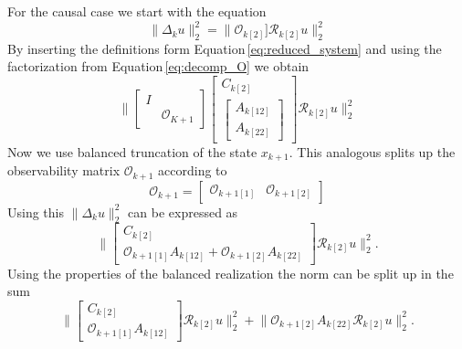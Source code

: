 \documentclass[doctype=mastersthesis,BCOR=15mm,biblatex]{ldvbook}%
\newcommand{\R}{\mathcal{R}} %
\newcommand{\Ob}{\mathcal{O}} %
\newcommand{\eye}{I} %
\begin{document}
For the causal case we start with the equation
\begin{equation}
	\|\Delta_k u\|_2^2 = \|\Ob_{k[2]}] \R_{k[2]} u\|_2^2
\end{equation}
By inserting the definitions form Equation\,\ref{eq:reduced_system} and using the factorization from Equation\,\ref{eq:decomp_O} we obtain 
\begin{equation}
	\Bigg\|
	\begin{bmatrix}
	\eye & \\
	& \Ob_{K+1}
	\end{bmatrix}
	\begin{bmatrix}
	C_{k[2]}\\
	\begin{bmatrix}
	A_{k[12]}\\
	A_{k[22]}
	\end{bmatrix}
	\end{bmatrix}  \R_{k[2]} u\Bigg\|_2^2
\end{equation}
Now we use balanced truncation of the state $x_{k+1}$.
This analogous splits up the observability matrix $\Ob_{k+1}$ according to
\begin{equation}
	\Ob_{k+1} = 
	\begin{bmatrix}
	\Ob_{k+1[1]} & \Ob_{k+1[2]}
	\end{bmatrix}
\end{equation}
Using this $\|\Delta_k u\|_2^2$ can be expressed as
\begin{equation}
	\Bigg\|
\begin{bmatrix}
C_{k[2]}\\
\Ob_{k+1[1]}A_{k[12]}+
\Ob_{k+1[2]}A_{k[22]}
\end{bmatrix}  \R_{k[2]} u\Bigg\|_2^2
.
\end{equation}
Using the properties of the balanced realization the norm can be split up in the sum
\begin{equation}
\Big\|
\begin{bmatrix}
C_{k[2]}\\
\Ob_{k+1[1]}A_{k[12]}
\end{bmatrix}  \R_{k[2]} u
\Big\|_2^2
+
\Big\|
\Ob_{k+1[2]}A_{k[22]}
 \R_{k[2]} u
\Big\|_2^2
.
\end{equation}
\end{document}
